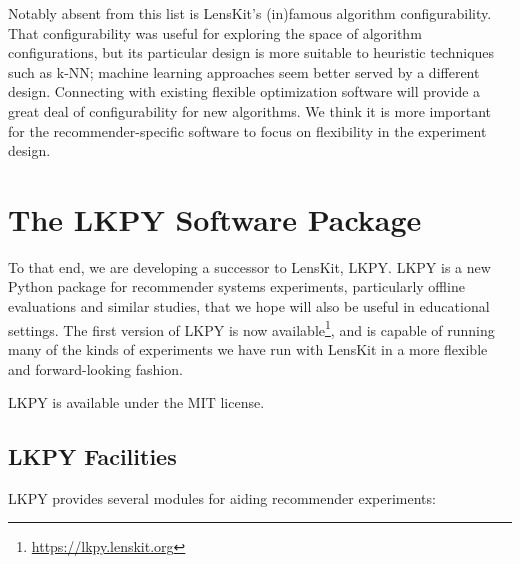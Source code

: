 Notably absent from this list is LensKit's (in)famous algorithm configurability.
That configurability was useful for exploring the space of algorithm configurations, but its particular design is more suitable to heuristic techniques such as k-NN; machine learning approaches seem better served by a different design.
Connecting with existing flexible optimization software will provide a great deal of configurability for new algorithms.
We think it is more important for the recommender-specific software to focus on flexibility in the experiment design.

\section{The LKPY Software Package}

To that end, we are developing a successor to LensKit, LKPY.
LKPY is a new Python package for recommender systems experiments, particularly offline evaluations and similar studies, that we hope will also be useful in educational settings.
The first version of LKPY is now available\footnote{\url{https://lkpy.lenskit.org}}, and is capable of running many of the kinds of experiments we have run with LensKit in a more flexible and forward-looking fashion.

LKPY is available under the MIT license.

\subsection{LKPY Facilities}
LKPY provides several modules for aiding recommender experiments:


